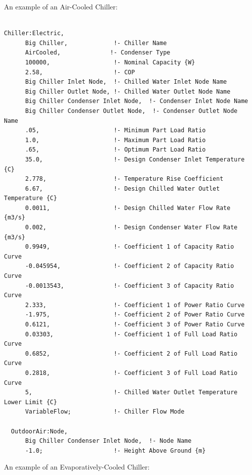 An example of an Air-Cooled Chiller:

\begin{lstlisting}

Chiller:Electric,
      Big Chiller,             !- Chiller Name
      AirCooled,              !- Condenser Type
      100000,                  !- Nominal Capacity {W}
      2.58,                    !- COP
      Big Chiller Inlet Node,  !- Chilled Water Inlet Node Name
      Big Chiller Outlet Node, !- Chilled Water Outlet Node Name
      Big Chiller Condenser Inlet Node,  !- Condenser Inlet Node Name
      Big Chiller Condenser Outlet Node,  !- Condenser Outlet Node Name
      .05,                     !- Minimum Part Load Ratio
      1.0,                     !- Maximum Part Load Ratio
      .65,                     !- Optimum Part Load Ratio
      35.0,                    !- Design Condenser Inlet Temperature {C}
      2.778,                   !- Temperature Rise Coefficient
      6.67,                    !- Design Chilled Water Outlet Temperature {C}
      0.0011,                  !- Design Chilled Water Flow Rate {m3/s}
      0.002,                   !- Design Condenser Water Flow Rate {m3/s}
      0.9949,                  !- Coefficient 1 of Capacity Ratio Curve
      -0.045954,               !- Coefficient 2 of Capacity Ratio Curve
      -0.0013543,              !- Coefficient 3 of Capacity Ratio Curve
      2.333,                   !- Coefficient 1 of Power Ratio Curve
      -1.975,                  !- Coefficient 2 of Power Ratio Curve
      0.6121,                  !- Coefficient 3 of Power Ratio Curve
      0.03303,                 !- Coefficient 1 of Full Load Ratio Curve
      0.6852,                  !- Coefficient 2 of Full Load Ratio Curve
      0.2818,                  !- Coefficient 3 of Full Load Ratio Curve
      5,                       !- Chilled Water Outlet Temperature Lower Limit {C}
      VariableFlow;            !- Chiller Flow Mode

  OutdoorAir:Node,
      Big Chiller Condenser Inlet Node,  !- Node Name
      -1.0;                    !- Height Above Ground {m}
\end{lstlisting}

An example of an Evaporatively-Cooled Chiller:

